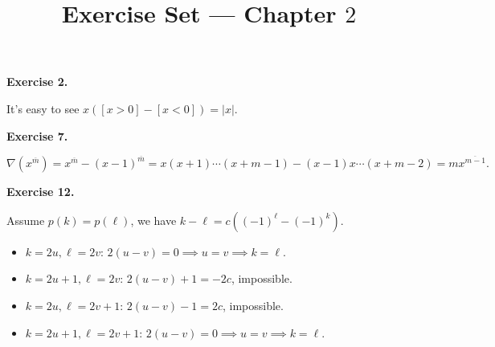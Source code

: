 \documentclass[a4paper]{article}
\title{Exercise Set --- Chapter $2$}
\date{}
\newenvironment{exercise}[1]{
	\par
	\noindent\textbf{Exercise #1.}\quad
}{
	\par
	\bigskip
}
\newcommand{\pbra}[1]{\left( #1 \right)}
\begin{document}
\maketitle

\begin{exercise}{2}
    It's easy to see $x([x>0]-[x<0])=|x|$.
\end{exercise}

\begin{exercise}{7}
    $$
    \nabla\pbra{x^{\overline m}}=x^{\overline m}-(x-1)^{\overline m}
    =x(x+1)\cdots(x+m-1)-(x-1)x\cdots(x+m-2)=mx^{\overline{m-1}}.
    $$
\end{exercise}

\begin{exercise}{12}
    Assume $p(k)=p(\ell)$, we have $k-\ell=c\pbra{(-1)^\ell-(-1)^k}$.
    \begin{itemize}
        \item $k=2u,\ell=2v$: $2(u-v)=0\implies u=v\implies k=\ell$.
        \item $k=2u+1,\ell=2v$: $2(u-v)+1=-2c$, impossible.
        \item $k=2u,\ell=2v+1$: $2(u-v)-1=2c$, impossible.
        \item $k=2u+1,\ell=2v+1$: $2(u-v)=0\implies u=v\implies k=\ell$.
    \end{itemize}
\end{exercise}
\end{document}
